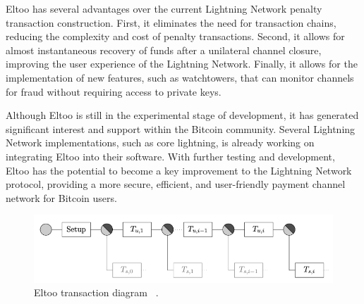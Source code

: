 Eltoo has several advantages over the current Lightning Network penalty transaction construction.
First, it eliminates the need for transaction chains, reducing the complexity and cost of
penalty transactions. Second, it allows for almost instantaneous recovery of funds after
a unilateral channel closure, improving the user experience of the Lightning Network. Finally,
it allows for the implementation of new features, such as watchtowers, that can monitor channels
for fraud without requiring access to private keys.

Although Eltoo is still in the experimental stage of development, it has generated significant
interest and support within the Bitcoin community. Several Lightning Network implementations,
such as core lightning, is already working on integrating Eltoo into their software.
With further testing and development, Eltoo has the potential to become a key improvement to
the Lightning Network protocol, providing a more secure, efficient, and user-friendly payment
channel network for Bitcoin users.

\begin{figure}[h]
  \begin{center}
    \includegraphics[width=0.6\columnwidth]{imgs/1_USwvkUzr2-EHHkImnYz6gw.png}
  \end{center}
  \caption{Eltoo transaction diagram ~\cite{eltoo}.}
  \label{fig:eltoo_diagram_tx}
\end{figure}
